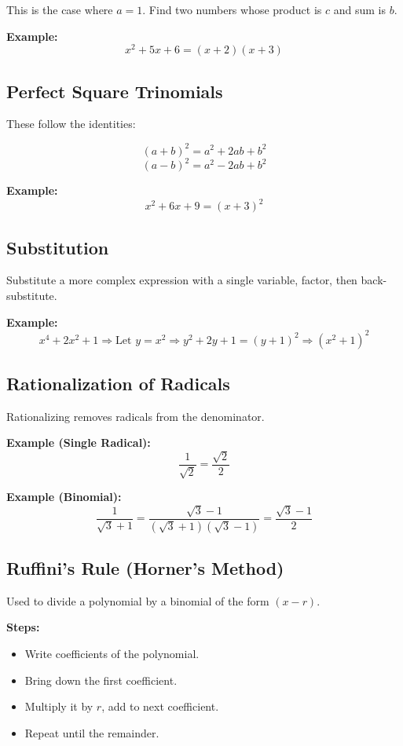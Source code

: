 This is the case where $a = 1$. Find two numbers whose product is $c$ and sum is $b$.

\textbf{Example:}
\[
x^2 + 5x + 6 = (x + 2)(x + 3)
\]

\subsection{Perfect Square Trinomials}

These follow the identities:

\[
(a + b)^2 = a^2 + 2ab + b^2
\]
\[
(a - b)^2 = a^2 - 2ab + b^2
\]

\textbf{Example:}
\[
x^2 + 6x + 9 = (x + 3)^2
\]

\subsection{Substitution}

Substitute a more complex expression with a single variable, factor, then back-substitute.

\textbf{Example:}
\[
x^4 + 2x^2 + 1 \Rightarrow \text{Let } y = x^2 \Rightarrow y^2 + 2y + 1 = (y + 1)^2 \Rightarrow (x^2 + 1)^2
\]

\subsection{Rationalization of Radicals}

Rationalizing removes radicals from the denominator.

\textbf{Example (Single Radical):}
\[
\frac{1}{\sqrt{2}} = \frac{\sqrt{2}}{2}
\]

\textbf{Example (Binomial):}
\[
\frac{1}{\sqrt{3} + 1} = \frac{\sqrt{3} - 1}{(\sqrt{3} + 1)(\sqrt{3} - 1)} = \frac{\sqrt{3} - 1}{2}
\]

\subsection{Ruffini’s Rule (Horner’s Method)}

Used to divide a polynomial by a binomial of the form $(x - r)$.

\textbf{Steps:}
\begin{itemize}
    \item Write coefficients of the polynomial.
    \item Bring down the first coefficient.
    \item Multiply it by $r$, add to next coefficient.
    \item Repeat until the remainder.
\end{itemize}


